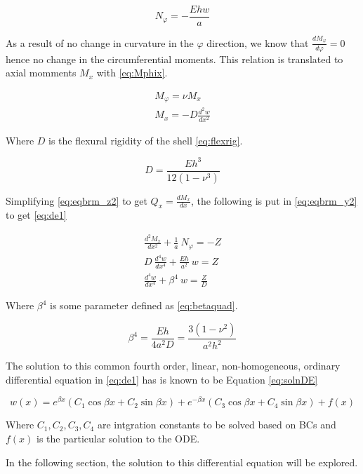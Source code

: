 \begin{equation}
	\label{eq:Nphi_simpl}
	N_\varphi = - \frac{Ehw}{a}
\end{equation}

As a result of no change in curvature in the $\varphi$ direction, we know that $\frac{dM_\varphi}{d\varphi}= 0$ hence no change in the circumferential moments. This relation is translated to axial momments $M_x$ with \ref{eq:Mphix}.

\begin{equation}
	\label{eq:Mphix}
	\begin{aligned}
	M_\varphi = \nu M_x\\
	M_x = -D \frac{d^2w}{dx^2}
	\end{aligned}
\end{equation}

Where $D$ is the flexural rigidity of the shell \ref{eq:flexrig}.


\begin{equation}
	\label{eq:flexrig}
	D = \frac{Eh^3}{12(1-\nu^3)}
\end{equation}

Simplifying \ref{eq:eqbrm_z2} to get $Q_x = \frac{dM_x}{dx}$, the following is put in \ref{eq:eqbrm_y2} to get \ref{eq:de1}

\begin{equation}
	\label{eq:de1}
	\begin{aligned}
	\frac{d^2M_x}{dx^2}+\frac{1}{a} \ N_\varphi = -Z\\
	D\ \frac{d^4w}{dx^4}+\frac{Eh}{a^2} \ w = Z\\
	\frac{d^4w}{dx^4}+\beta^4 \ w = \frac{Z}{D}
	\end{aligned}
\end{equation} 

Where $\beta^4$ is some parameter defined as \ref{eq:betaquad}.

\begin{equation}
	\label{eq:betaquad}
	\beta^4 = \frac{Eh}{4a^2D}= \frac{3(1-\nu^2)}{a^2h^2}
\end{equation}

The solution to this common fourth order, linear, non-homogeneous, ordinary differential equation in \ref{eq:de1} has is known to be Equation \ref{eq:solnDE}

\begin{equation}
	\label{eq:solnDE}
	w(x)=e^{\beta x} \left(C_1 \cos \beta x +C_2 \sin \beta x \right)+e^{-\beta x} \left(C_3 \cos \beta x +C_4 \sin \beta x \right) +f(x)
\end{equation}

Where $ C_1, C_2, C_3, C_4$ are intgration constants to be solved based on BCs and $f(x)$ is the particular solution to the ODE.

In the following section, the solution to this differential equation will be explored.
